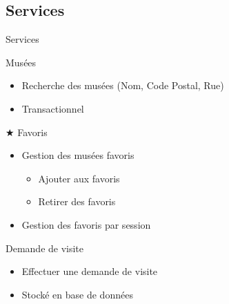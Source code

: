 \FlorentSpeak
\subsection{Services}
\begin{frame}{Services}
	\pause
	\begin{block}{Musées}
		\begin{itemize}
			\item Recherche des musées (Nom, Code Postal, Rue)
			\item Transactionnel
		\end{itemize}
	\end{block}	
	\vfill
	\pause
	\begin{block}{$\bigstar$ Favoris}
		\begin{itemize}
			\item Gestion des musées favoris
			\begin{itemize}
				\item Ajouter aux favoris
				\item Retirer des favoris
			\end{itemize}
			\item Gestion des favoris par session
		\end{itemize}
	\end{block}
	\pause
	\vfill	
	\begin{block}{Demande de visite}
		\begin{itemize}
			\item Effectuer une demande de visite				
			\item Stocké en base de données
		\end{itemize}
	\end{block}
\end{frame}